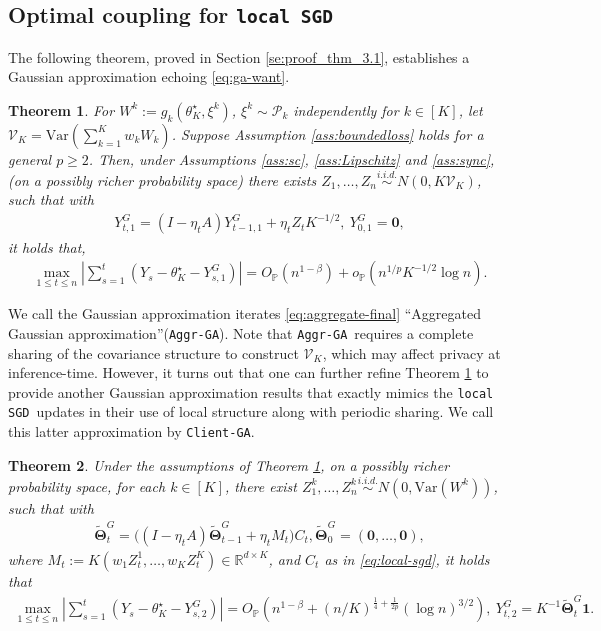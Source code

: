 \documentclass[a4paper,11pt]{article}
\numberwithin{equation}{section}
\theoremstyle{plain}
\newtheorem{theorem}{Theorem}[section]
\theoremstyle{remark}
\def\R{\mathbb{R}}
\def\bT{\mathbf{\Theta}}
\newcommand{\DFL}{\texttt{local SGD}}
\newcommand{\minparam}{\theta^\star_K}
\newcommand{\IP}{\mathbb{P}}
\newcommand{\ag}{\texttt{Aggr-GA}}
\newcommand{\cg}{\texttt{Client-GA}}
\newcommand{\var}{\mathrm{Var}}
\begin{document}
\subsection{Optimal coupling for \DFL} \label{se:kmt_thm}
\vspace{-0.025 in}
The following theorem, proved in Section \ref{se:proof_thm_3.1}, establishes a Gaussian approximation echoing \eqref{eq:ga-want}.
\begin{theorem} \label{thm: kmt_dfl}
     For $W^k := g_k(\minparam, \xi^k)$, $\xi^k \sim \mathcal{P}_k$ independently for $k \in [K]$, let $\mathcal{V}_K=\var(\sum_{k=1}^K w_k W_k)$. Suppose Assumption \ref{ass:boundedloss} holds for a general $p\geq2$. Then, under Assumptions \ref{ass:sc}, \ref{ass:Lipschitz} and \ref{ass:sync}, (on a possibly richer probability space) there exists $Z_1, \ldots, Z_n \overset{i.i.d.}{\sim} N(0, K\mathcal{V}_K)$, such that with 
    \begin{align}\label{eq:aggr-ga-1}
    Y_{t,1}^{G} = (I- \eta_t A)Y_{t-1, 1}^{G}+ \eta_t Z_tK^{-1/2}, \ Y_{0,1}^G= \mathbf{0},
\end{align}
    it holds that,     \begin{align}\label{eq:aggregate-final}
        \max_{1\leq t\leq n}|\sum_{s=1}^t(Y_s-\minparam - Y_{s,1}^G)|= O_{\IP}(n^{1-\beta}) + o_{\IP}(n^{1/p}K^{-1/2}\log n).
    \end{align}
\end{theorem}
 We call the Gaussian approximation iterates \eqref{eq:aggregate-final} ``Aggregated Gaussian approximation''(\ag). Note that \ag\ requires a complete sharing of the covariance structure to construct $\mathcal{V}_K$, which may affect privacy at inference-time. However, it turns out that one can further refine Theorem \ref{thm: kmt_dfl} to provide another Gaussian approximation results that exactly mimics the \DFL\ updates in their use of local structure along with periodic sharing. We call this latter approximation by \cg.
\begin{theorem}\label{thm:kmt-client-ga}
    Under the assumptions of Theorem \ref{thm: kmt_dfl}, on a possibly richer probability space, for each $k \in [K]$, there exist $Z_1^k, \ldots, Z_n^k \overset{i.i.d.}{\sim} N(0, \var(W^k))$, such that with
    \begin{align} \label{eq:theta_diamond_gaussian}
    \tilde{\bT}_t^{G} = \big((I -\eta_t A) \tilde{\bT}_{t-1}^{G} + \eta_t M_t\big)C_t, \tilde{\bT}_0^G=(\mathbf{0}, \ldots, \mathbf{0}), 
\end{align}
where $M_t:= K(w_1 Z_t^1, \ldots, w_K Z_t^K)\in \R^{d\times K}$, and $C_t$ as in \eqref{eq:local-sgd}, it holds that 
\begin{align} \label{eq:client-final}
    \max_{1\leq t\leq n}|\sum_{s=1}^t(Y_s- \minparam - Y_{s,2}^G)|= O_{\IP}(n^{1-\beta}+(n/K)^{\frac{1}{4}+ \frac{1}{2p}}(\log n)^{3/2}), \ Y_{t,2}^G=K^{-1}\tilde{\bT}_t^G \mathbf{1}.
\end{align}
\end{theorem}
\end{document}
